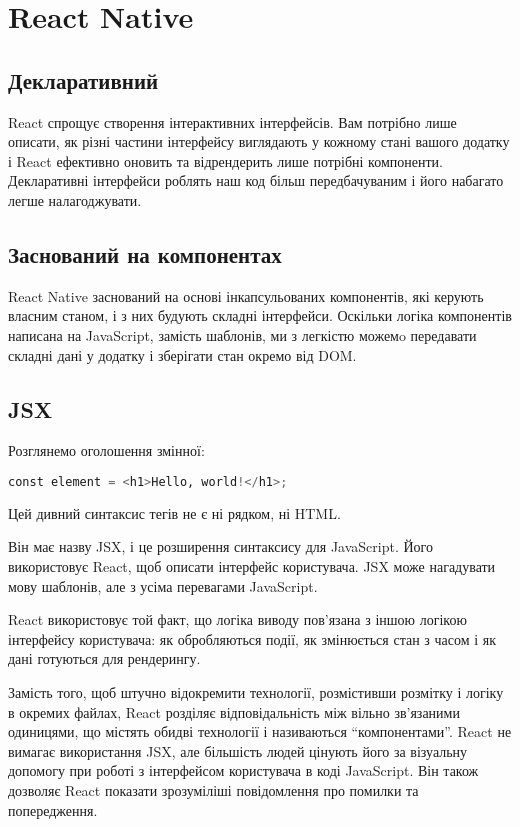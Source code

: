 \chapter{React Native}
\label{ch2}


\section{Декларативний}
\label{section.2.1}

React спрощує створення інтерактивних інтерфейсів.
Вам потрібно лише описати, як різні частини інтерфейсу виглядають у кожному стані вашого додатку і React ефективно оновить та відрендерить лише потрібні компоненти.
Декларативні інтерфейси роблять наш код більш передбачуваним і його набагато легше налагоджувати.


\section{Заснований на компонентах}
\label{section.2.2}
React Native заснований на основі інкапсульованих компонентів, які керують власним станом, і з них будують складні інтерфейси.
Оскільки логіка компонентів написана на JavaScript, замість шаблонів, ми з легкістю можемo передавати складні дані у додатку і зберігати стан окремо від DOM.


\section{JSX}
\label{section.2.3}
Розглянемо оголошення змінної:
\begin{lstlisting}[style=light, language=Python,label={lst:jsx_hello},caption=JSX Hello World]
const element = <h1>Hello, world!</h1>;
\end{lstlisting}

Цей дивний синтаксис тегів не є ні рядком, ні HTML.

Він має назву JSX, і це розширення синтаксису для JavaScript.
Його використовує React, щоб описати інтерфейс користувача.
JSX може нагадувати мову шаблонів, але з усіма перевагами JavaScript.

React використовує той факт, що логіка виводу пов’язана з іншою логікою інтерфейсу користувача: як обробляються події, як змінюється стан з часом і як дані готуються для рендерингу.

Замість того, щоб штучно відокремити технології, розмістивши розмітку і логіку в окремих файлах, React розділяє відповідальність між вільно зв’язаними одиницями, що містять обидві технології і називаються “компонентами”.
React не вимагає використання JSX, але більшість людей цінують його за візуальну допомогу при роботі з інтерфейсом користувача в коді JavaScript.
Він також дозволяє React показати зрозуміліші повідомлення про помилки та попередження.


